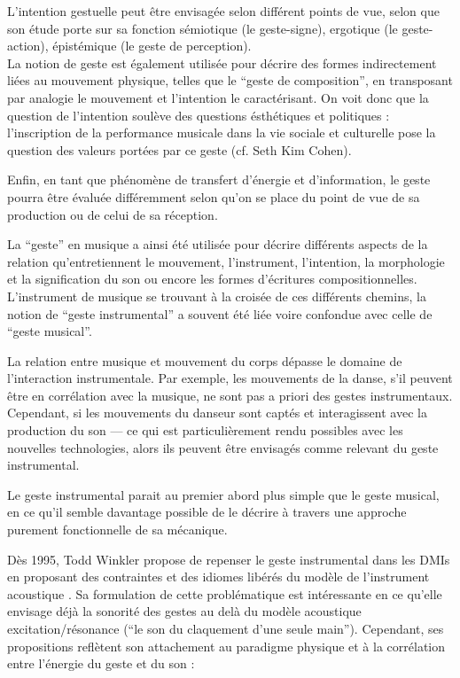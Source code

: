  \cite{imberty_mouvement_2013}

\noindent L'intention gestuelle peut être envisagée selon différent points de vue, selon que son étude porte sur sa fonction sémiotique (le geste-signe), ergotique (le geste-action), épistémique (le geste de perception).\\
\indent La notion de geste est également utilisée pour décrire des formes indirectement liées au mouvement physique, telles que le ``geste de composition'', en transposant par analogie le mouvement et l'intention le caractérisant. On voit donc que la question de l'intention soulève des questions ésthétiques et politiques : l'inscription de la performance musicale dans la vie sociale et culturelle pose la question des valeurs portées par ce geste (cf. Seth Kim Cohen).

\indent Enfin, en tant que phénomène de transfert d'énergie et d'information, le geste pourra être évaluée différemment selon qu'on se place du point de vue de sa production ou de celui de sa réception. 

La ``geste'' en musique a ainsi été utilisée pour décrire différents aspects de la relation qu'entretiennent le mouvement, l'instrument, l'intention, la morphologie et la signification du son ou encore les formes d'écritures compositionnelles. L'instrument de musique se trouvant à la croisée de ces différents chemins, la notion de ``geste instrumental'' a souvent été liée voire confondue avec celle de ``geste musical''. 

La relation entre musique et mouvement du corps dépasse le domaine de l'interaction instrumentale. Par exemple, les mouvements de la danse, s'il peuvent être en corrélation avec la musique, ne sont pas a priori des gestes instrumentaux. Cependant, si les mouvements du danseur sont captés et interagissent avec la production du son — ce qui est particulièrement rendu possibles avec les nouvelles technologies, alors ils peuvent être envisagés comme relevant du geste instrumental.

Le geste instrumental parait au premier abord plus simple que le geste musical, en ce qu'il semble davantage possible de le décrire à travers une approche purement fonctionnelle de sa mécanique. 

Dès 1995, Todd Winkler propose de repenser le geste instrumental dans les \glspl{DMI} en proposant des contraintes et des idiomes libérés du modèle de l'instrument acoustique \cite{winkler_making_1995}. Sa formulation de cette problématique est intéressante en ce qu'elle envisage déjà la sonorité des gestes au delà du modèle acoustique excitation/résonance (``le son du claquement d'une seule main''). Cependant, ses propositions reflètent son attachement au paradigme physique et à la corrélation entre l'énergie du geste et du son :

